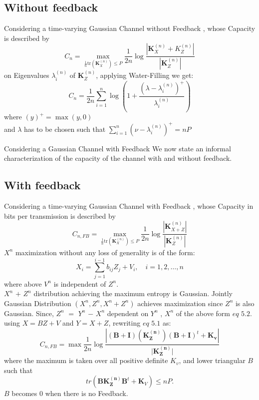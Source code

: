 \subsection{Without feedback}
Considering a time-varying Gaussian Channel without Feedback , whose Capacity is described by
\begin{equation}
C_{n} = \max_{\frac{1}{n}\text{tr}(\mathbf{K}_X^{(n)}) \leq P} \frac{1}{2n} \log \frac{|\mathbf{K}^{(n)}_{X}+ {K}^{(n)}_{Z}|}{|\mathbf{K}^{(n)}_Z|}
\end{equation}
%
on Eigenvalues ${\lambda_i^{(n)}}$ of $\mathbf{K}_Z^{(n)}$, applying Water-Filling we get:
\begin{equation}
C_n = \frac{1}{2n} \sum_{i=1}^n \log \left(1 + \frac{(\lambda - {\lambda_i^{(n)}})^+}{\lambda_i^{(n)}} \right)
\end{equation}
where $(y)^+ = \max(y, 0)$ 
\\
and $\lambda$ has to be chosen such that $\sum_{i=1}^n (\nu - \lambda_i^{(n)})^+ = nP$

Considering a Gaussian Channel with Feedback
We now state an informal characterization of the capacity of the channel with and without feedback.

\subsection{With feedback}
Considering a time-varying Gaussian Channel with Feedback , whose Capacity in bits per transmission is described by
\begin{equation}
C_{n,FB} = \max_{\frac{1}{n}\text{tr}(\mathbf{K}_X^{(n)}) \leq P} \frac{1}{2n} \log \frac{|\mathbf{K}^{(n)}_{X+Z}|}{|\mathbf{K}^{(n)}_Z|}
\tag{5.1}
\end{equation}
\newpage
$X^n$ maximization without any loss of generality is of the form:
\begin{equation}
X_i = \sum_{j=1}^{i-1} b_{ij}Z_j + V_i, \quad i=1,2,\dots,n 
\tag{5.2}
\end{equation}
where above $V^n$ is independent of $Z^n$.
\\
$X^n$ $+$ $Z^n$ distribution achieving the maximum entropy is Gaussian. Jointly Gaussian Distribution $(X^n, Z^n,X^n+ Z^n)$ achieves maximization since $Z^n$ is also Gaussian.
Since, $Z^n$ $=$ $Y^n$ $-$ $X^n$ dependent on $Y^n$ , $X^n$ of the above form $eq $ $5.2$.
 using $X = {BZ} + {V}$ and ${Y} = {X} + {Z}$, rewriting $eq $ $5.1$ as:
\begin{equation}
C_{n,FB} = \max \frac{1}{2n} \log  \frac{|(\mathbf{B+I})(\mathbf{K^{(n)}_Z})(\mathbf{B+I})^t+\mathbf{K_v}|}{|\mathbf{K^{(n)}_Z|}}  \label{eq:10.100}
\end{equation}
where the maximum is taken over all positive definite ${K_v}$, and lower triangular ${B}$ such that
\begin{equation}
tr(\mathbf{B}\mathbf{K^{(n)}_Z}\mathbf{B}^t + \mathbf{K}_V) \leq nP. \label{eq:10.101}
\end{equation}
${B}$ becomes $0$ when there is no Feedback.

